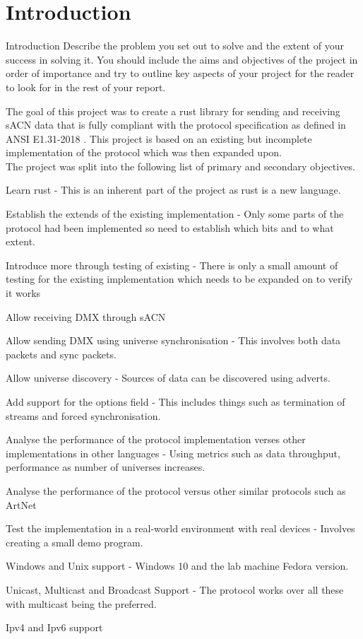 \documentclass[11pt,a4paper,notitlepage]{report}
\begin{document}
	
	\tableofcontents
	\pagebreak
	
	\section{Introduction}
		Introduction
		Describe the problem you set out to solve and the
		extent of your success in solving it. You should include
		the aims and objectives of the project in order of
		importance and try to outline key aspects of your
		project for the reader to look for in the rest of your
		report.
		
	The goal of this project was to create a rust library for sending and receiving sACN data that is fully compliant with the protocol specification as defined in ANSI E1.31-2018 \cite{ANSI_E1.31}. This project is based on an existing but incomplete implementation of the protocol \cite{ORIGNIAL_IMPL} which was then expanded upon.\\
	
	The project was split into the following list of primary and secondary objectives.\\
	\begin{list}{}{Primary}
		\item Learn rust - This is an inherent part of the project as rust is a new language.
		\item Establish the extends of the existing implementation - Only some parts of the protocol had been implemented so need to establish which bits and to what extent.
		\item Introduce more through testing of existing - There is only a small amount of testing for the existing implementation which needs to be expanded on to verify it works
		\item Allow receiving DMX through sACN
		\item Allow sending DMX using universe synchronisation - This involves both data packets and sync packets.
		\item Allow universe discovery - Sources of data can be discovered using adverts.
		\item Add support for the options field - This includes things such as termination of streams and forced synchronisation.
	\end{list}
	\begin{list}{}{Secondary}
		\item Analyse the performance of the protocol implementation verses other implementations in other languages - Using metrics such as data throughput, performance as number of universes increases.
		\item Analyse the performance of the protocol versus other similar protocols such as ArtNet \cite{ArtNet}
		\item Test the implementation in a real-world environment with real devices - Involves creating a small demo program.
		\item Windows and Unix support - Windows 10 and the lab machine Fedora version.
		\item Unicast, Multicast and Broadcast Support - The protocol works over all these with multicast being the preferred.
		\item Ipv4 and Ipv6 support
	\end{list}
	
\end{document}
